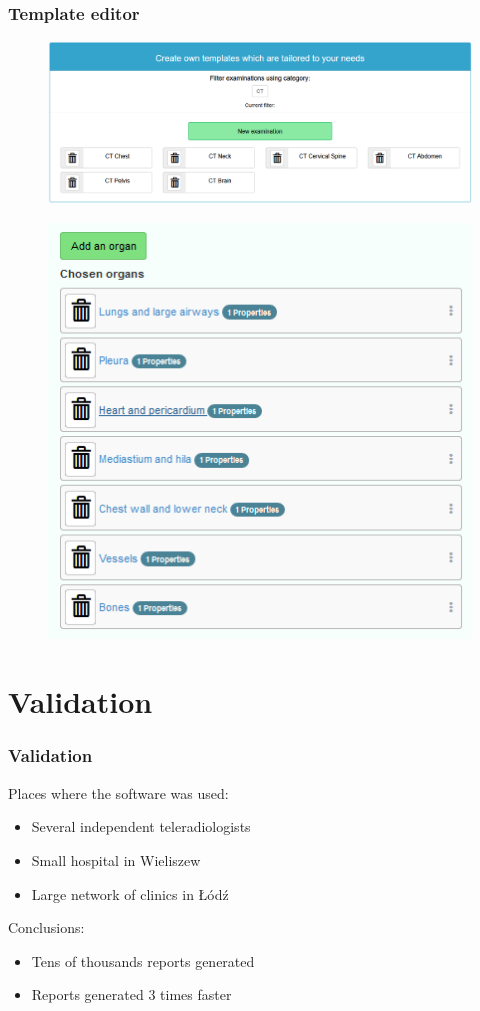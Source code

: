 \documentclass{beamer}
\begin{document}
\begin{frame}
\frametitle{Template editor}
\begin{figure}
	\centering
	\includegraphics[width=1\linewidth]{../templates-list}
	\label{fig:templates-list}
\end{figure}

\end{frame}
\begin{frame}
\begin{figure}
	\centering
	\includegraphics[width=0.5\linewidth]{../template-organs-list}
	\label{fig:template-organ-list}
\end{figure}
\end{frame}

\section {Validation}
\begin{frame}
\frametitle{Validation}
Places where the software was used:
\begin{itemize}
	\item Several independent teleradiologists
	\item Small hospital in Wieliszew
	\item Large network of clinics in Łódź
\end{itemize}

Conclusions:
\begin{itemize}
	\item Tens of thousands reports generated
	\item Reports generated 3 times faster
\end{itemize}
\end{frame}
\end{document}
